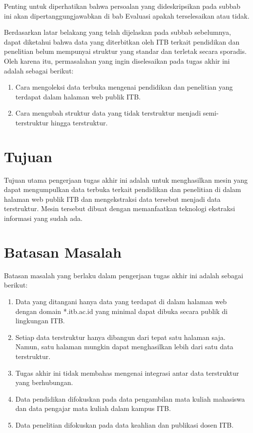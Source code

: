 Penting untuk diperhatikan bahwa persoalan yang dideskripsikan pada subbab ini akan dipertanggungjawabkan di bab Evaluasi apakah terselesaikan atau tidak.

Berdasarkan latar belakang yang telah dijelaskan pada subbab sebelumnya, dapat diketahui bahwa data yang diterbitkan oleh ITB terkait pendidikan dan penelitian belum mempunyai struktur yang standar dan terletak secara sporadis. Oleh karena itu, permasalahan yang ingin diselesaikan pada tugas akhir ini adalah sebagai berikut:

\begin{enumerate}
    \item Cara mengoleksi data terbuka mengenai pendidikan dan penelitian yang terdapat dalam halaman web publik ITB.
    \item Cara mengubah struktur data yang tidak terstruktur menjadi semi-terstruktur hingga terstruktur.
\end{enumerate}

\section{Tujuan}

Tujuan utama pengerjaan tugas akhir ini adalah untuk menghasilkan mesin yang dapat mengumpulkan data terbuka terkait pendidikan dan penelitian di dalam halaman web publik ITB dan mengekstraksi data tersebut menjadi data terstruktur. Mesin tersebut dibuat dengan memanfaatkan teknologi ekstraksi informasi yang sudah ada.

\section{Batasan Masalah}

Batasan masalah yang berlaku dalam pengerjaan tugas akhir ini adalah sebagai berikut:

\begin{enumerate}
    \item Data yang ditangani hanya data yang terdapat di dalam halaman web dengan domain *.itb.ac.id yang minimal dapat dibuka secara publik di lingkungan ITB.
    \item Setiap data terstruktur hanya dibangun dari tepat satu halaman saja. Namun, satu halaman mungkin dapat menghasilkan lebih dari satu data terstruktur.
    \item Tugas akhir ini tidak membahas mengenai integrasi antar data terstruktur yang berhubungan.
    \item Data pendidikan difokuskan pada data pengambilan mata kuliah mahasiswa dan data pengajar mata kuliah dalam kampus ITB.
    \item Data penelitian difokuskan pada data keahlian dan publikasi dosen ITB.
\end{enumerate}

